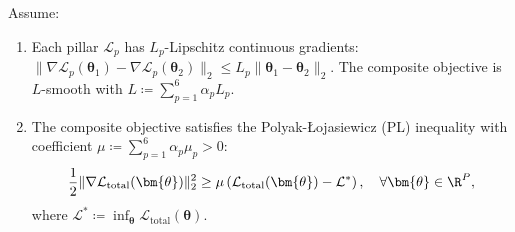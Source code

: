 \begin{theorem}
Assume:
\begin{enumerate}
    \item Each pillar $\mathcal{L}_p$ has $L_p$-Lipschitz continuous gradients: $\|\nabla \mathcal{L}_p(\bm{\theta}_1) - \nabla \mathcal{L}_p(\bm{\theta}_2)\|_2 \le L_p \|\bm{\theta}_1 - \bm{\theta}_2\|_2$.
    The composite objective is $L$-smooth with $L \coloneqq \sum_{p=1}^6 \alpha_p L_p$.
    \item The composite objective satisfies the Polyak-\L{}ojasiewicz (PL) inequality with coefficient $\mu \coloneqq \sum_{p=1}^6 \alpha_p \mu_p > 0$:
    \begin{equation}
    \frac{1}{2} \|\nabla \mathcal{L}_{\text{total}}(\bm{\theta})\|_2^2 \ge \mu \left( \mathcal{L}_{\text{total}}(\bm{\theta}) - \mathcal{L}^* \right), \quad \forall \bm{\theta} \in \R^P,
    \label{eq:pl_condition_def}
    \end{equation}
    where $\mathcal{L}^* \coloneqq \inf_{\bm{\theta}} \mathcal{L}_{\text{total}}(\bm{\theta})$.
\end{enumerate}


\end{theorem}
